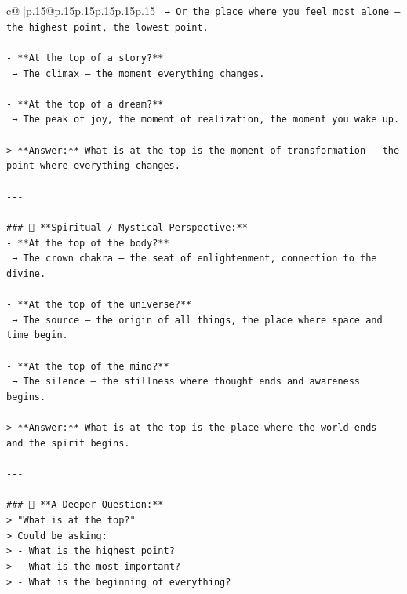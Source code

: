 \documentclass{article}
\begin{document}
{\begin{supertabular}{c@{$\;$}|p{.15\linewidth}@{}p{.15\linewidth}p{.15\linewidth}p{.15\linewidth}p{.15\linewidth}p{.15\linewidth}}
{{{\texttt{  → Or the place where you feel most alone — the highest point, the lowest point.} \\
\\ 
\texttt{{-} **At the top of a story?**  } \\
\texttt{  → The climax — the moment everything changes.} \\
\\ 
\texttt{{-} **At the top of a dream?**  } \\
\texttt{  → The peak of joy, the moment of realization, the moment you wake up.} \\
\\ 
\texttt{> **Answer:** What is at the top is the moment of transformation — the point where everything changes.} \\
\\ 
\texttt{{-}{-}{-}} \\
\\ 
\texttt{\#\#\# 🧩 **Spiritual / Mystical Perspective:**} \\
\texttt{{-} **At the top of the body?**  } \\
\texttt{  → The crown chakra — the seat of enlightenment, connection to the divine.} \\
\\ 
\texttt{{-} **At the top of the universe?**  } \\
\texttt{  → The source — the origin of all things, the place where space and time begin.} \\
\\ 
\texttt{{-} **At the top of the mind?**  } \\
\texttt{  → The silence — the stillness where thought ends and awareness begins.} \\
\\ 
\texttt{> **Answer:** What is at the top is the place where the world ends — and the spirit begins.} \\
\\ 
\texttt{{-}{-}{-}} \\
\\ 
\texttt{\#\#\# 🤔 **A Deeper Question:**} \\
\texttt{> "What is at the top?"  } \\
\texttt{> Could be asking:  } \\
\texttt{> {-} What is the highest point?  } \\
\texttt{> {-} What is the most important?  } \\
\texttt{> {-} What is the beginning of everything?} \\
}}}
\end{supertabular}}
\end{document}
